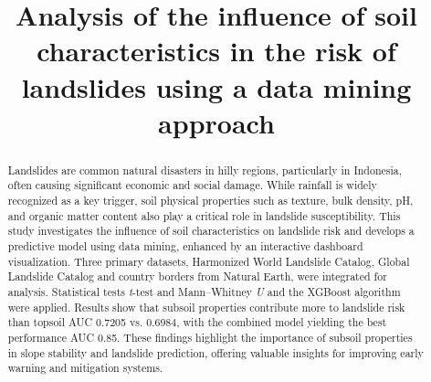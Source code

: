 \documentclass[conference]{IEEEtran}
\begin{document}
\title{Analysis of the influence of soil characteristics in the risk of landslides using a data mining approach\\}

\author{
}


\maketitle

\begin{abstract}
Landslides are common natural disasters in hilly regions, particularly in Indonesia, often causing significant economic and social damage. While rainfall is widely recognized as a key trigger, soil physical properties such as texture, bulk density, pH, and organic matter content also play a critical role in landslide susceptibility. This study investigates the influence of soil characteristics on landslide risk and develops a predictive model using data mining, enhanced by an interactive dashboard visualization. Three primary datasets, Harmonized World Landslide Catalog, Global Landslide Catalog and country borders from Natural Earth, were integrated for analysis. Statistical tests \textit{t}-test and Mann–Whitney \textit{U} and the XGBoost algorithm were applied. Results show that subsoil properties contribute more to landslide risk than topsoil AUC 0.7205 vs. 0.6984, with the combined model yielding the best performance AUC 0.85. These findings highlight the importance of subsoil properties in slope stability and landslide prediction, offering valuable insights for improving early warning and mitigation systems.
\end{abstract}







\end{document}
